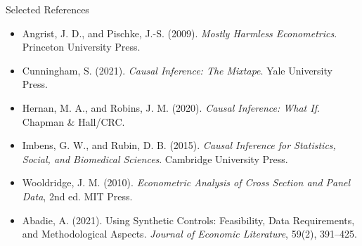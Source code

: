 \documentclass[aspectratio=169,11pt]{beamer}
\begin{document}
\begin{frame}{Selected References}
\small
\begin{itemize}
\item Angrist, J. D., and Pischke, J.-S. (2009). \textit{Mostly Harmless Econometrics}. Princeton University Press.
\item Cunningham, S. (2021). \textit{Causal Inference: The Mixtape}. Yale University Press.
\item Hernan, M. A., and Robins, J. M. (2020). \textit{Causal Inference: What If}. Chapman \& Hall/CRC.
\item Imbens, G. W., and Rubin, D. B. (2015). \textit{Causal Inference for Statistics, Social, and Biomedical Sciences}. Cambridge University Press.
\item Wooldridge, J. M. (2010). \textit{Econometric Analysis of Cross Section and Panel Data}, 2nd ed. MIT Press.
\item Abadie, A. (2021). Using Synthetic Controls: Feasibility, Data Requirements, and Methodological Aspects. \textit{Journal of Economic Literature}, 59(2), 391--425.
\end{itemize}
\end{frame}

\contactslide
\end{document}
